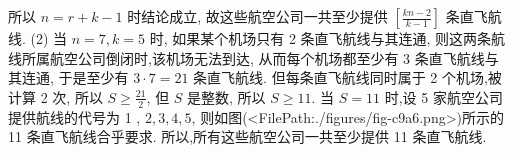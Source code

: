 所以 $n=r+k-1$ 时结论成立, 故这些航空公司一共至少提供 $\left[\frac{k n-2}{k-1}\right]$ 条直飞航线.
(2) 当 $n=7, k=5$ 时, 如果某个机场只有 2 条直飞航线与其连通, 则这两条航线所属航空公司倒闭时,该机场无法到达, 从而每个机场都至少有 3 条直飞航线与其连通, 于是至少有 $3 \cdot 7=21$ 条直飞航线.
但每条直飞航线同时属于 2 个机场,被计算 2 次, 所以 $S \geqslant \frac{21}{2}$, 但 $S$ 是整数, 所以 $S \geqslant 11$.
当 $S=11$ 时,设 5 家航空公司提供航线的代号为 1 , $2,3,4,5$, 则如图(<FilePath:./figures/fig-c9a6.png>)所示的 11 条直飞航线合乎要求.
所以,所有这些航空公司一共至少提供 11 条直飞航线.


